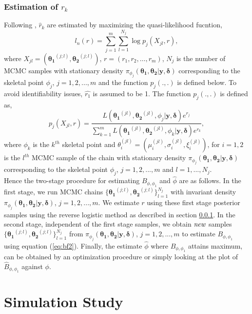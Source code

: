 \documentclass[11pt]{article}
\theoremstyle{remboldstyle}
\newcommand{\bth}{{\boldsymbol{\theta_1}}}
\newcommand{\bthe}{{\boldsymbol{\theta_2}}}
\newcommand{\y}{{\boldsymbol{y}}}
\newcommand{\de}{{\boldsymbol{\delta}}}
\begin{document}
\subsubsection{Estimation of $r_k$}
\label{sec:revlog}
\noindent
Following \cite{geyer:1994}, $\hat{r}_k$ are estimated by maximizing the quasi-likelihood fucntion,
\begin{equation}\label{func1}
l_n(r) = \sum\limits_{j = 1}^m\sum\limits_{l = 1}^{N_j} \log p_j(X_{jl},r),
\end{equation}
where $X_{jl} = (\bth^{(j;l)}, \bthe^{(j;l)})$, $r = (r_1, r_2, \dots, r_m)$, $N_j$ is the number of MCMC samples with stationary density $\pi_{\phi_j}(\bth, \bthe| \y, \de)$ corresponding to the skeletal point $\phi_j$, $j = 1, 2,..., m$ and the function $p_j(.,.)$ is defined below. To avoid identifiability issues, $\hat{r_1}$ is assumed to be 1. The function $p_j(.,.)$ is defined as,
\begin{equation}
p_j(X_{jl}, r) = \frac{L(\bth^{(jl)}, \bthe^{(jl)}, \phi_j| \y, \de)e^{r_j}}{\sum\limits_{k = 1}^m L(\bth^{(jl)}, \bthe^{(jl)}, \phi_k| \y, \de)e^{r_k}},
\end{equation}
where $\phi_k$ is the $k^{th}$ skeletal point and $\theta_i^{(jl)} = (\mu_i^{(jl)}, \sigma_i^{(jl)}, \xi_i^{(jl)})$, for $i = 1, 2$ is the $l^{th}$ MCMC sample of the chain with stationary density $\pi_{\phi_j}(\bth, \bthe| \y, \de)$ corresponding to the skeletal point $\phi_j$, $j = 1, 2,..., m$ and $l = 1,...,N_j$.\\
Hence the two-stage procedure for estimating $B_{\phi, \phi_1}$ and $\hat{\phi}$ are as follows. In the first stage, we run MCMC chains $\{\bth^{(j;l)}, \bthe^{(j;l)}\}_{l=1}^{N_j}$ with invariant density $\pi_{\phi_j}(\bth, \bthe| \y, \de)$, $j = 1, 2, ... , m$. We estimate $r$ using these first stage posterior samples using the reverse logistic method as described in section \ref{sec:revlog}. In the second stage, independent of the first stage samples, we obtain $\it{new}$ samples $\{\bth^{(j;l)}, \bthe^{(j;l)}\}_{l=1}^{N_j}$ from $\pi_{\phi_j}(\bth, \bthe| \y, \de)$, $j = 1, 2, ... , m$ to estimate $B_{\phi, \phi_1}$ using equation (\ref{eq:bf2}). Finally, the estimate $\hat{\phi}$ where $\hat{B}_{\phi, \phi_1}$ attains maximum, can be obtained by an optimization procedure or simply looking at the plot of $\hat{B}_{\phi, \phi_1}$ against $\phi$.
\section{Simulation Study}
\label{sec:sim}
\end{document}
